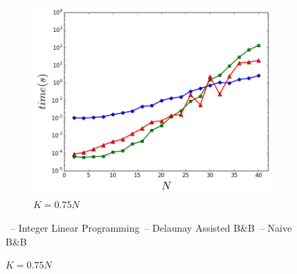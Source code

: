 \begin{figure}[t]
\begin{center}
\begin{subfigure}[b]{0.3\linewidth}
		\includegraphics[width=0.9\linewidth]{Pictures/k3} 
		\caption{$K=0.75N$} 
		\label{fig:fixed_k:c} 
	\end{subfigure}
	\end{center}
	\begin{center}
	\footnotesize
    \textcolor{blue}{\cmark}\ -- Integer Linear Programming\quad   \textcolor{red}{\tmark}\ -- Delaunay Assisted B\&B\quad \textcolor{green}{\smark}\ -- Naive B\&B
    \end{center}
\end{figure}

